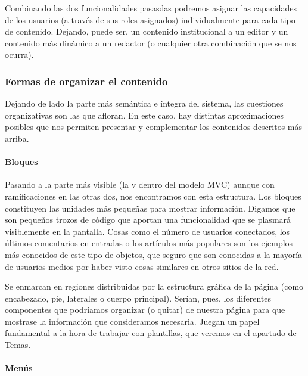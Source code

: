 \par Combinando las dos funcionalidades pasasdas podremos asignar las capacidades de los usuarios (a través de sus roles asignados) individualmente para cada tipo de contenido. Dejando, puede ser, un contenido institucional a un editor y un contenido más dinámico a un redactor (o cualquier otra combinación que se nos ocurra).

\subsubsection{Formas de organizar el contenido}

\par Dejando de lado la parte más semántica e íntegra del sistema, las cuestiones organizativas son las que afloran. En este caso, hay distintas aproximaciones posibles que nos permiten presentar y complementar los contenidos descritos más arriba.

\paragraph{Bloques}

\par Pasando a la parte más visible (la v dentro del modelo MVC) aunque con ramificaciones en las otras dos, nos encontramos con esta estructura. Los bloques constituyen las unidades más pequeñas para mostrar información. Digamos que son pequeños trozos de código que aportan una funcionalidad que se plasmará visiblemente en la pantalla. Cosas como el número de usuarios conectados, los últimos comentarios en entradas o los artículos más populares son los ejemplos más conocidos de este tipo de objetos, que seguro que son conocidas a la mayoría de usuarios medios por haber visto cosas similares en otros sitios de la red.

\par Se enmarcan en regiones distribuidas por la estructura gráfica de la página (como encabezado, pie, laterales o cuerpo principal). Serían, pues, los diferentes componentes que podríamos organizar (o quitar) de nuestra página para que mostrase la información que consideramos necesaria. Juegan un papel fundamental a la hora de trabajar con plantillas, que veremos en el apartado de Temas.


\paragraph{Menús}


